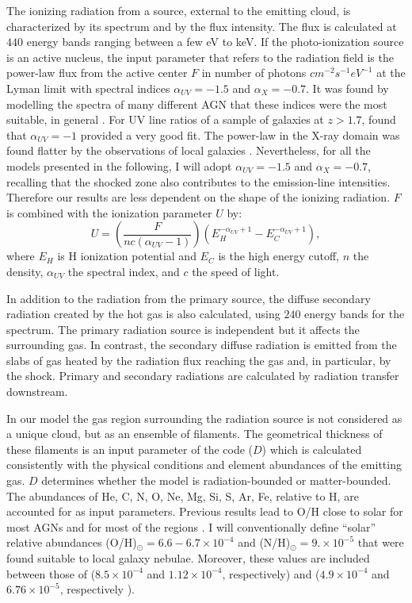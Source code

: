 \documentclass[../thesis.tex]{subfiles}
\begin{document}
The ionizing radiation from a source, external to the emitting cloud, is characterized by its spectrum and by the flux intensity. 
The flux is calculated at $440$ energy bands ranging between a few eV to keV.
If the photo-ionization source is an active nucleus, the input parameter that refers to the radiation field is the power-law flux  from the active center $F$ in number of photons $\si{cm^{-2} s^{-1} eV^{-1}}$ at the Lyman limit with spectral indices  $\alpha_{UV}=-1.5$ and $\alpha_X=-0.7$.
It was found by modelling the spectra of many different AGN that these indices were the most suitable, in general \citep[see, e.g.][ and references therein]{Contini83,Aldrovandi84,Rodriguez05}.
For UV line ratios of a sample of galaxies at $z> 1.7$, \citet{Villar97} found that $\alpha_{UV}=-1$ provided a very good fit.
The power-law in the X-ray domain was found flatter by the observations of local galaxies \citep[$\alpha_X=-1$, e.g.][]{Crenshaw02,Turner01}.
Nevertheless, for all the models presented in the following, I will adopt $\alpha_{UV}=-1.5$ and $\alpha_{X} = -0.7$, recalling that the shocked zone also contributes to the emission-line intensities.  
Therefore our results are less dependent on the shape of the ionizing radiation.
$F$ is combined with the ionization parameter $U$ by: 
\begin{equation}
\label{eq:Umarc}
U= \left(\frac{F}{n c (\alpha_{UV} -1)}\right) \left(E_H^{-\alpha_{UV} +1} - E_C^{-\alpha_{UV} +1}\right),
\end{equation}
where $E_H$ is H ionization potential  and $E_C$ is the high energy cutoff, $n$ the density, $\alpha_{UV}$ the spectral index, and $c$ the speed of light.

In addition to the radiation from the primary source, the diffuse secondary radiation created by the hot gas is also calculated, using $240$ energy bands for the spectrum.
The primary radiation source is independent but it affects the surrounding gas.
In contrast, the secondary diffuse radiation is emitted from the slabs of gas heated by the radiation flux reaching the gas and, in particular, by the shock.
Primary and secondary radiations are calculated by radiation transfer downstream.

In our model the gas region surrounding the radiation source is not considered as a unique cloud, but as an ensemble of filaments. 
The geometrical thickness of these filaments is an input parameter of the code ($D$) which is calculated consistently with the physical conditions and element abundances of the emitting gas.
$D$ determines whether the model is radiation-bounded or matter-bounded.
The abundances of He, C, N, O, Ne, Mg, Si, S, Ar, Fe, relative to H, are accounted for as input parameters. 
Previous results lead to O/H close to solar for most AGNs and for most of the  regions \citep[e.g.][]{Contini17}.
I will conventionally define ``solar''  relative abundances (O/H)$_{\odot }=6.6 - 6.7 \times10^{-4}$ and (N/H)$_{\odot }= 9.\times10^{-5}$ \citep{Allen76,Grevesse98} that were found suitable to local galaxy nebulae. 
Moreover, these values are included between those of \citet{Anders89} ($8.5\times10^{-4}$ and $1.12\times10^{-4}$, respectively) and \citet{Asplund09} ($4.9\times10^{-4}$ and $6.76\times10^{-5}$, respectively ).
\end{document}
